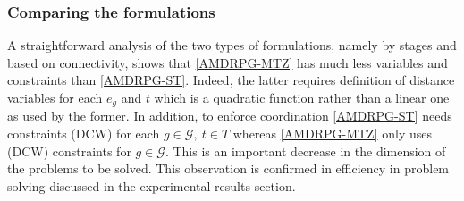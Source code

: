 \subsubsection{Comparing the formulations\label{ss:compare}}
\noindent
A straightforward analysis of the two types of formulations, namely by stages and based on connectivity, shows that \eqref{AMDRPG-MTZ} has much less variables and constraints than \eqref{AMDRPG-ST}. Indeed, the latter requires definition of distance variables for each $e_g$ and $t$ which is a quadratic function rather than a linear one as used by the former. In addition, to enforce coordination \eqref{AMDRPG-ST} needs constraints (DCW) for each $g\in \mathcal{G},\ t\in T$ whereas \eqref{AMDRPG-MTZ} only uses (DCW) constraints for $g\in \mathcal{G}$. This is an important decrease in the dimension of the problems to be solved. This observation is confirmed in efficiency in problem solving discussed in the experimental results section.


